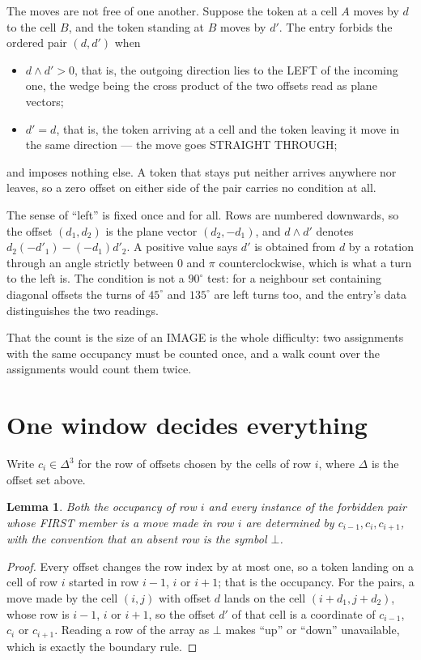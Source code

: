 \documentclass[11pt,a4paper]{article}
\theoremstyle{plain}
\newtheorem{lemma}[theorem]{Lemma}
\theoremstyle{definition}
\begin{document}
The moves are not free of one another. Suppose the token at a cell $A$ moves by $d$ to the
cell $B$, and the token standing at $B$ moves by $d'$. The entry forbids the ordered pair
$(d,d')$ when
\begin{itemize}
\item $d\wedge d'>0$, that is, the outgoing direction lies to the LEFT of the incoming one, the wedge being the cross product of the two offsets read as plane vectors;
\item $d'=d$, that is, the token arriving at a cell and the token leaving it move in the same direction --- the move goes STRAIGHT THROUGH;
\end{itemize}
and imposes nothing else. A token that stays put neither arrives anywhere nor leaves, so a
zero offset on either side of the pair carries no condition at all.

The sense of ``left'' is fixed once and for all. Rows are numbered downwards, so the offset
$(d_1,d_2)$ is the plane vector $(d_2,-d_1)$, and $d\wedge d'$ denotes
$d_2(-d'_1)-(-d_1)d'_2$. A positive value says $d'$ is obtained from $d$ by a rotation through
an angle strictly between $0$ and $\pi$ counterclockwise, which is what a turn to the left is.
The condition is not a $90^\circ$ test: for a neighbour set containing diagonal offsets the
turns of $45^\circ$ and $135^\circ$ are left turns too, and the entry's data distinguishes the
two readings.

That the count is the size of an IMAGE is the whole difficulty: two assignments with the same
occupancy must be counted once, and a walk count over the assignments would count them twice.

\section{One window decides everything}

Write $c_i\in\Delta^{3}$ for the row of offsets chosen by the cells of row $i$, where
$\Delta$ is the offset set above.

\begin{lemma}\label{lem:win}
Both the occupancy of row $i$ and every instance of the forbidden pair whose FIRST member is a
move made in row $i$ are determined by $c_{i-1},c_i,c_{i+1}$, with the convention that an
absent row is the symbol $\bot$.
\end{lemma}

\begin{proof}
Every offset changes the row index by at most one, so a token landing on a cell of row $i$
started in row $i-1$, $i$ or $i+1$; that is the occupancy. For the pairs, a move made by the
cell $(i,j)$ with offset $d$ lands on the cell $(i+d_1,j+d_2)$, whose row is $i-1$, $i$ or
$i+1$, so the offset $d'$ of that cell is a coordinate of $c_{i-1}$, $c_i$ or $c_{i+1}$.
Reading a row of the array as $\bot$ makes ``up'' or ``down'' unavailable, which is exactly
the boundary rule.
\end{proof}
\end{document}
